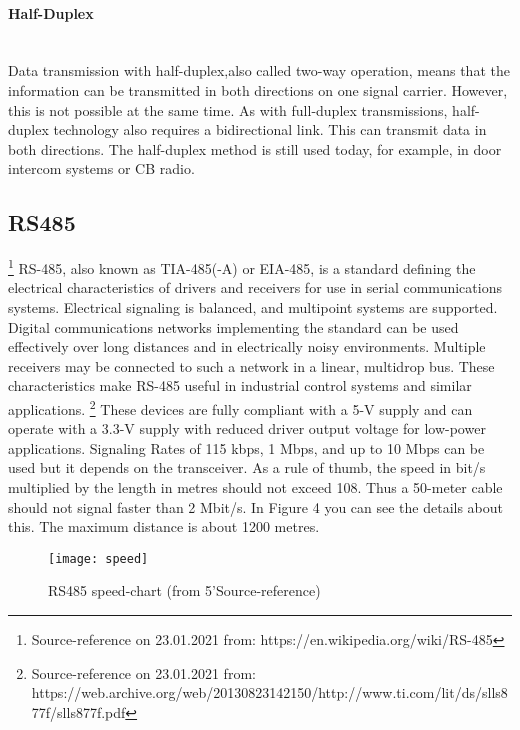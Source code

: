\documentclass[11pt]{scrartcl}
\begin{document}
	\paragraph{Half-Duplex} \mbox{}\\
	Data transmission with half-duplex,also called two-way operation, means that the information can be transmitted in both directions on one signal carrier. However, this is not possible at the same time.
As with full-duplex transmissions, half-duplex technology also requires a bidirectional link. This can transmit data in both directions. The half-duplex method is still used today, for example, in door intercom systems or CB radio. 

	
	
\newpage
	\subsection{RS485}
	\footnote{\label{foot:4}Source-reference on 23.01.2021 from: https://en.wikipedia.org/wiki/RS-485} 
RS-485, also known as TIA-485(-A) or EIA-485, is a standard defining the electrical characteristics of drivers and receivers for use in serial communications systems. Electrical signaling is balanced, and multipoint systems are supported. Digital communications networks implementing the standard can be used effectively over long distances and in electrically noisy environments. Multiple receivers may be connected to such a network in a linear, multidrop bus. These characteristics make RS-485 useful in industrial control systems and similar applications.
\newline\newline
\footnote{\label{foot:5}Source-reference on 23.01.2021 from: https://web.archive.org/web/20130823142150/http://www.ti.com/lit/ds/slls877f/slls877f.pdf}
These devices are fully compliant with a 5-V supply and can operate with a 3.3-V supply with reduced driver output voltage for low-power applications. Signaling Rates of 115 kbps, 1 Mbps, and up to 10 Mbps can be used but it depends on the transceiver. As a rule of thumb, the speed in bit/s multiplied by the length in metres should not exceed 108. Thus a 50-meter cable should not signal faster than 2 Mbit/s. In Figure 4 you can see the details about this.  The maximum distance is about 1200 metres.
\newline
\begin{figure}[h]
		\centering
		\texttt{[image: speed]}
		\caption{RS485 speed-chart (from 5'Source-reference)}
\end{figure}	
\end{document}
